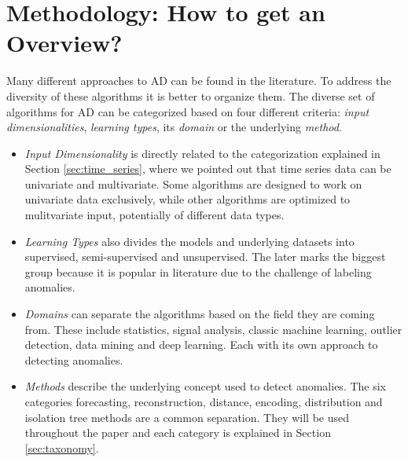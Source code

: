 \section{Methodology: How to get an Overview?}
Many different approaches to AD can be found in the literature. To address the diversity of these algorithms it is better to organize them. The diverse set of algorithms for AD can be categorized based on four different criteria: \textit{input dimensionalities}, \textit{learning types}, its \textit{domain} or the underlying \textit{method}.

\begin{itemize}
    \item \textit{Input Dimensionality} is directly related to the categorization explained in Section \ref{sec:time_series}, where we pointed out that time series data can be univariate and multivariate. Some algorithms are designed to work on univariate data exclusively, while other algorithms are optimized to mulitvariate input, potentially of different data types.
    
    \item \textit{Learning Types} also divides the models and underlying datasets into supervised, semi-supervised and unsupervised. The later marks the biggest group because it is popular in literature due to the challenge of labeling anomalies.

    \item \textit{Domains} can separate the algorithms based on the field they are coming from. These include statistics, signal analysis, classic machine learning, outlier detection, data mining and deep learning. Each with its own approach to detecting anomalies.
    
    \item\textit{Methods} describe the underlying concept used to detect anomalies. The six categories forecasting, reconstruction, distance, encoding, distribution and isolation tree methods are a common separation. They will be used throughout the paper and each category is explained in Section \ref{sec:taxonomy}.
\end{itemize}

